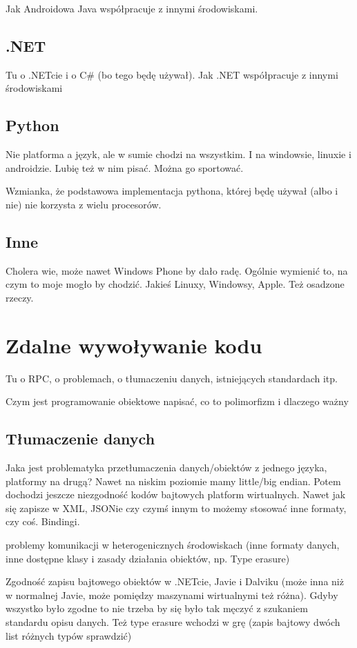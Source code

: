 Jak Androidowa Java współpracuje z innymi środowiskami.

\subsection{.NET}
Tu o .NETcie i o C\# (bo tego będę używał).
Jak .NET współpracuje z innymi środowiskami

\subsection{Python}
Nie platforma a język, ale w sumie chodzi na wszystkim. I na windowsie, linuxie i androidzie. Lubię też w nim pisać. Można go sportować.

Wzmianka, że podstawowa implementacja pythona, której będę używał (albo i nie) nie korzysta z wielu procesorów.

\subsection{Inne}
Cholera wie, może nawet Windows Phone by dało radę. Ogólnie wymienić to, na czym to moje mogło by chodzić. Jakieś Linuxy, Windowsy, Apple. Też osadzone rzeczy.

\section{Zdalne wywoływanie kodu}
Tu o RPC, o problemach, o tłumaczeniu danych, istniejących standardach itp.

Czym jest programowanie obiektowe napisać, co to polimorfizm i dlaczego ważny

\subsection{Tłumaczenie danych}
Jaka jest problematyka przetłumaczenia danych/obiektów z jednego języka, platformy na drugą?
Nawet na niskim poziomie mamy little/big endian. Potem dochodzi jeszcze niezgodność kodów bajtowych platform wirtualnych.
Nawet jak się zapisze w XML, JSONie czy czymś innym to możemy stosować inne formaty, czy coś. Bindingi.

problemy komunikacji w heterogenicznych środowiskach (inne formaty danych, inne dostępne klasy i zasady działania obiektów, np. Type erasure)

Zgodność zapisu bajtowego obiektów w .NETcie, Javie i Dalviku (może inna niż w normalnej Javie, może pomiędzy maszynami wirtualnymi też różna). Gdyby wszystko było zgodne to nie trzeba by się było tak męczyć z szukaniem standardu opisu danych. Też type erasure wchodzi w grę (zapis bajtowy dwóch list różnych typów sprawdzić)

